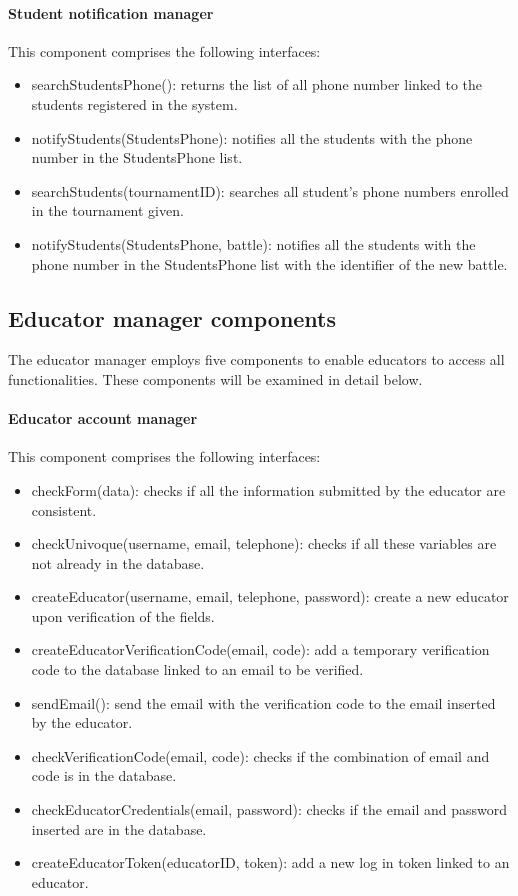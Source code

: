 \documentclass[12pt, a4paper]{report}
\begin{document}
    \paragraph*{Student notification manager}
    This component comprises the following interfaces: 
    \begin{itemize}
        \item searchStudentsPhone(): returns the list of all phone number linked to the students registered in the system. 
        \item notifyStudents(StudentsPhone): notifies all the students with the phone number in the StudentsPhone list. 
        \item searchStudents(tournamentID): searches all student's phone numbers enrolled in the tournament given.
        \item notifyStudents(StudentsPhone, battle): notifies all the students with the phone number in the StudentsPhone list with the identifier of the new battle. 
    \end{itemize}

    \subsection{Educator manager components}
    The educator manager employs five components to enable educators to access all functionalities. 
    These components will be examined in detail below.
    
    \paragraph*{Educator account manager}
    This component comprises the following interfaces: 
    \begin{itemize}
        \item checkForm(data): checks if all the information submitted by the educator are consistent. 
        \item checkUnivoque(username, email, telephone): checks if all these variables are not already in the database. 
        \item createEducator(username, email, telephone, password): create a new educator upon verification of the fields. 
        \item createEducatorVerificationCode(email, code): add a temporary verification code to the database linked to an email to be verified. 
        \item sendEmail(): send the email with the verification code to the email inserted by the educator. 
        \item checkVerificationCode(email, code): checks if the combination of email and code is in the database. 
        \item checkEducatorCredentials(email, password): checks if the email and password inserted are in the database. 
        \item createEducatorToken(educatorID, token): add a new log in token linked to an educator. 
    \end{itemize}
\end{document}
